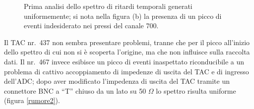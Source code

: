 \documentclass[10pt, oneside, a4paper]{article}   	%
\begin{document}
\begin{figure}[h]
	\centerline{
		}
		\caption{Prima analisi dello spettro di ritardi temporali generati uniformemente; si nota nella figura (b) la presenza di un picco di eventi indesiderato nei pressi del canale 700.}
		\label{rumore1}
\end{figure}
%

Il TAC nr.~437 non sembra presentare problemi, tranne che per il picco all'inizio dello spettro di cui non si è scoperta l'origine, ma che non influisce sulla raccolta dati. Il nr.~467 invece esibisce un picco di eventi inaspettato riconducibile a un problema di cattivo accoppiamento di impedenze di uscita del TAC e di ingresso dell'ADC; dopo aver modificato l'impedenza di uscita del TAC tramite un connettore BNC a ``T'' chiuso da un lato su 50 $\Omega$ lo spettro risulta uniforme (figura \ref{rumore2}).
\end{document}
